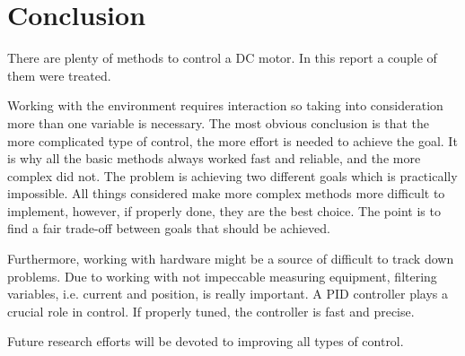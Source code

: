 \section{Conclusion}
There are plenty of methods to control a DC motor. In this report a couple of them were treated. 

Working with the environment requires interaction so taking into consideration more than one variable is necessary. The most obvious conclusion is that the more complicated type of control, the more effort is needed to achieve the goal. It is why all the basic methods always worked fast and reliable, and the more complex did not. The problem is achieving two different goals which is practically impossible. All things considered make more complex methods more difficult to implement, however, if properly done, they are the best choice. The point is to find a fair trade-off between goals that should be achieved. 

Furthermore, working with hardware might be a source of difficult to track down problems. Due to working with not impeccable measuring equipment, filtering variables, i.e. current and position, is really important. A PID controller plays a crucial role in control. If properly tuned, the controller is fast and precise. 

Future research efforts will be devoted to improving all types of control.
